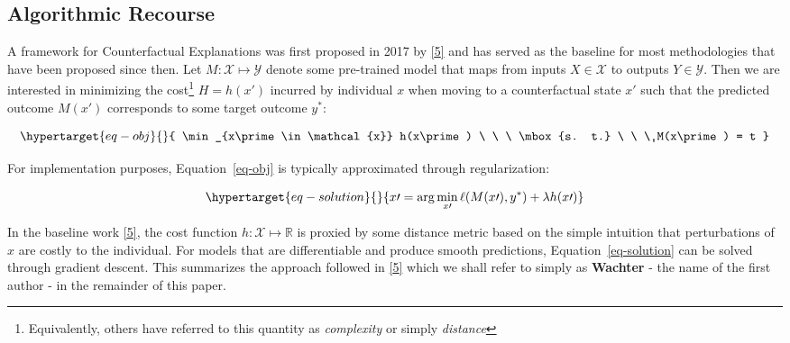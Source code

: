 \documentclass[
  conference]{IEEEtran}
\begin{document}
\hypertarget{sec-related-recourse}{%
\subsection{Algorithmic Recourse}\label{sec-related-recourse}}

A framework for Counterfactual Explanations was first proposed in 2017
by \protect\hyperlink{ref-wachter2017counterfactual}{{[}5{]}} and has
served as the baseline for most methodologies that have been proposed
since then. Let \(M: \mathcal{X} \mapsto \mathcal{Y}\) denote some
pre-trained model that maps from inputs \(X \in \mathcal{X}\) to outputs
\(Y \in \mathcal{Y}\). Then we are interested in minimizing the
cost\footnote{Equivalently, others have referred to this quantity as
  \emph{complexity} or simply \emph{distance}} \(H=h(x\prime)\) incurred
by individual \(x\) when moving to a counterfactual state \(x\prime\)
such that the predicted outcome \(M(x\prime)\) corresponds to some
target outcome \(y^*\):

\begin{equation}\protect\hypertarget{eq-obj}{}{
\min_{x\prime \in \mathcal{x}} h(x\prime) \ \ \ \mbox{s. t.} \ \ \ M(x\prime) = t
}\label{eq-obj}\end{equation}

For implementation purposes, Equation~\ref{eq-obj} is typically
approximated through regularization:

\begin{equation}\protect\hypertarget{eq-solution}{}{
x\prime = \arg \min_{x\prime}  \ell(M(x\prime),y^*) + \lambda h(x\prime)
}\label{eq-solution}\end{equation}

In the baseline work
\protect\hyperlink{ref-wachter2017counterfactual}{{[}5{]}}, the cost
function \(h: \mathcal{X} \mapsto \mathbb{R}\) is proxied by some
distance metric based on the simple intuition that perturbations of
\(x\) are costly to the individual. For models that are differentiable
and produce smooth predictions, Equation~\ref{eq-solution} can be solved
through gradient descent. This summarizes the approach followed in
\protect\hyperlink{ref-wachter2017counterfactual}{{[}5{]}} which we
shall refer to simply as \textbf{Wachter} - the name of the first author
- in the remainder of this paper.
\end{document}
